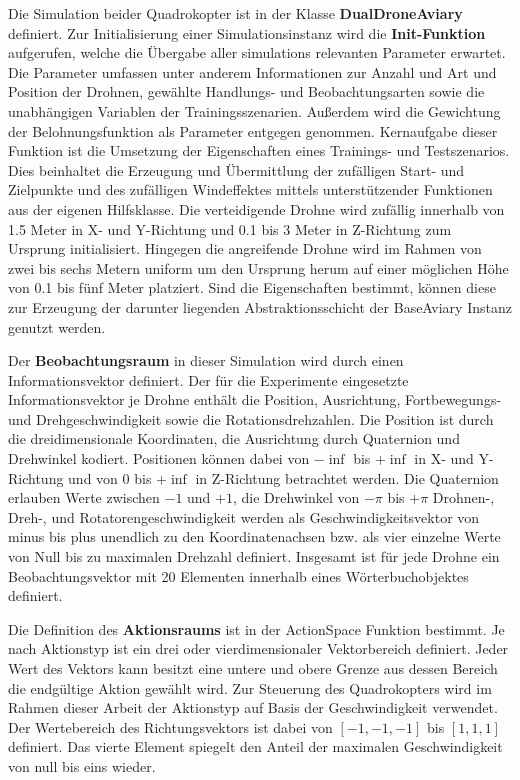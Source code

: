 Die Simulation beider Quadrokopter ist in der Klasse \textbf{DualDroneAviary} definiert.
Zur Initialisierung einer Simulationsinstanz wird die \textbf{Init-Funktion} aufgerufen, welche die Übergabe aller simulations relevanten Parameter erwartet.
Die Parameter umfassen unter anderem Informationen zur Anzahl und Art und Position der Drohnen, gewählte Handlungs- und Beobachtungsarten sowie die unabhängigen Variablen der Trainingsszenarien.
Außerdem wird die Gewichtung der Belohnungsfunktion als Parameter entgegen genommen.
Kernaufgabe dieser Funktion ist die Umsetzung der Eigenschaften eines Trainings- und Testszenarios.
Dies beinhaltet die Erzeugung und Übermittlung der zufälligen Start- und Zielpunkte und des zufälligen Windeffektes mittels unterstützender Funktionen aus der eigenen Hilfsklasse.
Die verteidigende Drohne wird zufällig innerhalb von 1.5 Meter in X- und Y-Richtung und 0.1 bis 3 Meter in Z-Richtung zum Ursprung initialisiert.
Hingegen die angreifende Drohne wird im Rahmen von zwei bis sechs Metern uniform um den Ursprung herum auf einer möglichen Höhe von 0.1 bis fünf Meter platziert.
Sind die Eigenschaften bestimmt, können diese zur Erzeugung der darunter liegenden Abstraktionsschicht der BaseAviary Instanz genutzt werden.

Der \textbf{Beobachtungsraum} in dieser Simulation wird durch einen Informationsvektor definiert.
Der für die Experimente eingesetzte Informationsvektor je Drohne enthält die Position, Ausrichtung, Fortbewegungs- und Drehgeschwindigkeit sowie die Rotationsdrehzahlen.
Die Position ist durch die dreidimensionale Koordinaten, die Ausrichtung durch Quaternion und Drehwinkel kodiert.
Positionen können dabei von $- \inf$ bis $+ \inf$ in X- und Y-Richtung und von $0$ bis $+ \inf$ in Z-Richtung betrachtet werden.
Die Quaternion erlauben Werte zwischen $-1$ und $+1$, die Drehwinkel von $- \pi$ bis $+ \pi$
Drohnen-, Dreh-, und Rotatorengeschwindigkeit werden als Geschwindigkeitsvektor von minus bis plus unendlich zu den Koordinatenachsen bzw. als vier einzelne Werte von Null bis zu maximalen Drehzahl definiert.
Insgesamt ist für jede Drohne ein Beobachtungsvektor mit 20 Elementen innerhalb eines Wörterbuchobjektes definiert.

Die Definition des \textbf{Aktionsraums} ist in der ActionSpace Funktion bestimmt.
Je nach Aktionstyp ist ein drei oder vierdimensionaler Vektorbereich definiert.
Jeder Wert des Vektors kann besitzt eine untere und obere Grenze aus dessen Bereich die endgültige Aktion gewählt wird.
Zur Steuerung des Quadrokopters wird im Rahmen dieser Arbeit der Aktionstyp auf Basis der Geschwindigkeit verwendet.
Der Wertebereich des Richtungsvektors ist dabei von $[-1,-1,-1]$ bis $[1,1,1]$ definiert. 
Das vierte Element spiegelt den Anteil der maximalen Geschwindigkeit von null bis eins wieder.

